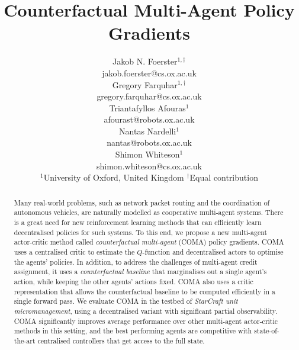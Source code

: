 \documentclass[letterpaper]{article}
\begin{document}
 
	
	\title{Counterfactual Multi-Agent Policy Gradients}
	\author{
		Jakob N. Foerster$^{1,\dagger}$\\
		jakob.foerster@cs.ox.ac.uk\\
		\And
		Gregory Farquhar$^{1,\dagger}$ \\
		gregory.farquhar@cs.ox.ac.uk \\
		\AND
		Triantafyllos Afouras$^{1}$\\
		afourast@robots.ox.ac.uk\\
		\And
		Nantas Nardelli$^{1}$\\
		nantas@robots.ox.ac.uk\\
		\And
		Shimon Whiteson$^1$\\
		shimon.whiteson@cs.ox.ac.uk\\
		\AND
		\textnormal{$^1$University of Oxford, United Kingdom \quad 
		$^\dagger$Equal contribution}
	}
	
	\maketitle

\begin{abstract}
\label{sec:abstract}
Many real-world problems, such as network packet routing  and the coordination of autonomous vehicles, are naturally modelled as cooperative multi-agent systems.  There is a great need for new reinforcement learning methods that can efficiently learn
decentralised policies for such systems.  To this end, we propose a new multi-agent actor-critic method called \emph{counterfactual multi-agent} (COMA) policy
gradients.  COMA uses a centralised critic to estimate the $Q$-function and
decentralised actors to optimise the agents' policies.  In addition, to address
the challenges of multi-agent credit assignment, it uses a \emph{counterfactual
baseline} that marginalises out a single agent's action, while keeping the other
agents' actions fixed. COMA also uses a critic representation that allows the
counterfactual baseline to be computed efficiently in a single forward pass. We
evaluate COMA in the testbed of \emph{StarCraft unit micromanagement}, using a
decentralised variant with significant partial observability. COMA significantly
improves average performance over other multi-agent actor-critic methods in this
setting,
and the best performing agents are competitive with  state-of-the-art centralised
controllers that get access to the full state.\end{abstract}
\end{document}
